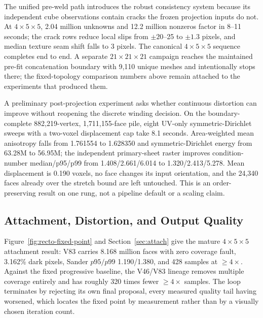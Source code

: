 The unified pre-weld path introduces the robust consistency system because its independent cube observations contain cracks the frozen projection inputs do not. At $4\times5\times5$, 2.04 million unknowns and 12.2 million nonzeros factor in 8--11 seconds; the crack rows reduce local slips from $\pm20$--25 to $\pm1.3$ pixels, and median texture seam shift falls to 3 pixels. The canonical $4\times5\times5$ sequence completes end to end. A separate $21\times21\times21$ campaign reaches the maintained pre-fit concatenation boundary with 9,110 unique meshes and intentionally stops there; the fixed-topology comparison numbers above remain attached to the experiments that produced them.

A preliminary post-projection experiment asks whether continuous distortion can improve without reopening the discrete winding decision. On the boundary-complete 882,219-vertex, 1,711,155-face pile, eight UV-only symmetric-Dirichlet sweeps with a two-voxel displacement cap take 8.1 seconds. Area-weighted mean anisotropy falls from 1.761554 to 1.628350 and symmetric-Dirichlet energy from 63.28M to 56.95M; the independent primary-sheet raster improves condition-number median/p95/p99 from 1.408/2.661/6.014 to 1.320/2.413/5.278. Mean displacement is 0.190 voxels, no face changes its input orientation, and the 24,340 faces already over the stretch bound are left untouched. This is an order-preserving result on one rung, not a pipeline default or a scaling claim.

\subsection{Attachment, Distortion, and Output Quality}

Figure~\ref{fig:recto-fixed-point} and Section~\ref{sec:attach} give the mature $4\times5\times5$ attachment result: V83 carries 8.168 million faces with zero coverage fault, 3.162\% dark pixels, Sander $p95/p99$ 1.190/1.380, and 428 samples at $\ge4\times$. Against the fixed progressive baseline, the V46/V83 lineage removes multiple coverage entirely and has roughly 320 times fewer $\ge4\times$ samples. The loop terminates by rejecting its own final proposal, every measured quality tail having worsened, which locates the fixed point by measurement rather than by a visually chosen iteration count.

